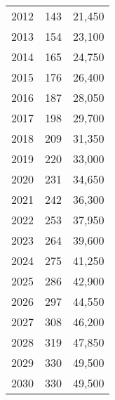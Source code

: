 {\begin{table}[]
\begin{tabular}{ccc}
2012                     & 143         & 21,450               \\
2013                     & 154         & 23,100               \\
2014                     & 165         & 24,750               \\
2015                     & 176         & 26,400               \\
2016                     & 187         & 28,050               \\
2017                     & 198         & 29,700               \\
2018                     & 209         & 31,350               \\
2019                     & 220         & 33,000               \\
2020                     & 231         & 34,650               \\
2021                     & 242         & 36,300               \\
2022                     & 253         & 37,950               \\
2023                     & 264         & 39,600               \\
2024                     & 275         & 41,250               \\
2025                     & 286         & 42,900               \\
2026                     & 297         & 44,550               \\
2027                     & 308         & 46,200               \\
2028                     & 319         & 47,850               \\
2029                     & 330         & 49,500               \\
2030                     & 330         & 49,500               
\end{tabular}
\end{table}}

